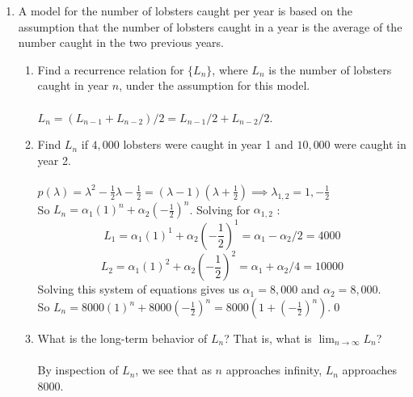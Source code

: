 \documentclass[12pt]{article}
\begin{document}
\begin{enumerate}
\item A model for the number of lobsters caught per year is
based on the assumption that the number of lobsters
caught in a year is the average of the number caught in
the two previous years.
\begin{enumerate}
\item Find a recurrence relation for $\{L_n\}$, where $L_n$ is the number of lobsters caught in year $n$, under the assumption
for this model.\\\\
$L_n = (L_{n-1} + L_{n-2})/2 = L_{n-1}/2 + L_{n-2}/2$.\\
\item Find $L_n$ if $4,000$ lobsters were caught in year 1 and
$10,000$ were caught in year 2.\\\\
$p(\lambda) = \lambda^2 - \frac{1}{2}\lambda - \frac{1}{2} = (\lambda-1)(\lambda+\frac{1}{2}) \implies \lambda_{1,2} = 1,-\frac{1}{2}$\\
So $L_n=\alpha_1(1)^n+\alpha_2(-\frac{1}{2})^n$. Solving for $\alpha_{1,2}$ :\\
\[L_1 = \alpha_1 (1)^1 + \alpha_2 (-\frac{1}{2})^1 = \alpha_1 - \alpha_2/2 = 4000\]
\[L_2 = \alpha_1 (1)^2 + \alpha_2 (-\frac{1}{2})^2 = \alpha_1 + \alpha_2/4 = 10000\]
Solving this system of equations gives us $\alpha_1 = 8,000$ and $\alpha_2 = 8,000$.\\
So $L_n = 8000(1)^n + 8000(-\frac{1}{2})^n = 8000(1+(-\frac{1}{2})^n)$.\qed
\item What is the long-term behavior of $L_n$? That is, what is $\lim_{n \to \infty} L_n$?\\\\
By inspection of $L_n$, we see that as $n$ approaches infinity, $L_n$ approaches 8000.
\end{enumerate}

\medskip


\end{enumerate}
\end{document}
